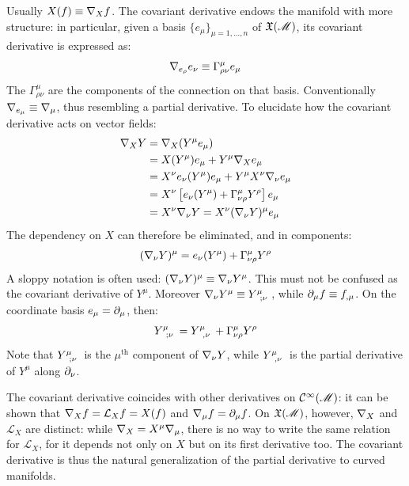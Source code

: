 Usually $ X(f) \equiv \nabla_X f $. The covariant derivative endows the manifold with more structure: in particular, given a basis $ \{e_{\mu}\}_{\mu = 1 , \dots , n} $ of $ \mathfrak{X}(\mathscr{M}) $, its covariant derivative is expressed as:
\begin{equation}
  \nabla_{e_{\rho}} e_{\nu} \equiv \Gamma^{\mu}_{\rho \nu} e_{\mu}
\end{equation}
The $ \Gamma^{\mu}_{\rho \nu} $ are the components of the connection on that basis. Conventionally $ \nabla_{e_{\mu}} \equiv \nabla_{\mu} $, thus resembling a partial derivative. To elucidate how the covariant derivative acts on vector fields:
\begin{equation*}
  \begin{split}
    \nabla_X Y
    &= \nabla_X (Y^\mu e_\mu) \\
    &= X(Y^\mu) e_\mu + Y^\mu \nabla_X e_\mu \\
    &= X^{\nu} e_{\nu} (Y^{\mu}) e_{\mu} + Y^{\mu} X^{\nu} \nabla_{\nu} e_{\mu} \\
    &= X^{\nu} \left[ e_{\nu}(Y^{\mu}) + \Gamma^{\mu}_{\nu \rho} Y^{\rho} \right] e_{\mu} \\
    &= X^{\nu} \nabla_{\nu} Y = X^{\nu} (\nabla_{\nu} Y)^{\mu} e_{\mu}
  \end{split}
\end{equation*}
The dependency on $ X $ can therefore be eliminated, and in components:
\begin{equation}
  (\nabla_\nu Y)^\mu = e_\nu (Y^\mu) + \Gamma^\mu_{\nu \rho} Y^\rho
\end{equation}
A sloppy notation is often used: $ (\nabla_\nu Y)^\mu \equiv \nabla_\nu Y^\mu $. This must not be confused as the covariant derivative of $ Y^\mu $. Moreover $ \na_\nu Y^\mu \equiv \tensor{Y}{^\mu_{;\nu}} $, while $ \partial_\mu f \equiv f_{,\mu} $. On the coordinate basis $ e_\mu = \partial_\mu $, then:
\begin{equation}
  \tensor{Y}{^\mu_{;\nu}} = \tensor{Y}{^\mu_{,\nu}} + \Gamma^\mu_{\nu \rho} Y^\rho
\end{equation}
Note that $ \tensor{Y}{^\mu_{;\nu}} $ is the $ \mu^{\text{th}} $ component of $ \nabla_\nu Y $, while $ \tensor{Y}{^\mu_{,\nu}} $ is the partial derivative of $ Y^{\mu} $ along $ \partial_{\nu} $.

The covariant derivative coincides with other derivatives on $ \mathcal{C}^{\infty}(\mathscr{M}) $: it can be shown that $ \nabla_X f = \mathcal{L}_X f = X(f) $ and $ \nabla_\mu f = \partial_\mu f $. On $ \mathfrak{X}(\mathscr{M}) $, however, $ \nabla_X $ and $ \mathcal{L}_X $ are distinct: while $ \nabla_X = X^\mu \nabla_\mu $, there is no way to write the same relation for $ \mathcal{L}_X $, for it depends not only on $ X $ but on its first derivative too. The covariant derivative is thus the natural generalization of the partial derivative to curved manifolds.

